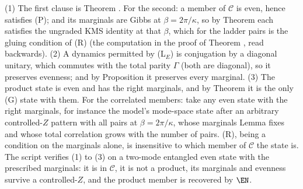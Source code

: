 (1) The first clause is Theorem . For the second: a member of $\mathcal{C}$ is even, hence satisfies (P); and its marginals are Gibbs at $\beta = 2\pi/\kappa$, so by Theorem  each satisfies the ungraded KMS identity at that $\beta$, which for the ladder pairs is the gluing condition of (R) (the computation in the proof of Theorem , read backwards). (2) A dynamics permitted by (L$_E$) is conjugation by a diagonal unitary, which commutes with the total parity $\Gamma$ (both are diagonal), so it preserves evenness; and by Proposition  it preserves every marginal. (3) The product state is even and has the right marginals, and by Theorem  it is the only (G) state with them. For the correlated members: take any even state with the right marginals, for instance the model's mode-space state after an arbitrary controlled-$Z$ pattern with all pairs at $\beta = 2\pi/\kappa$, whose marginals Lemma  fixes and whose total correlation grows with the number of pairs. (R), being a condition on the marginals alone, is insensitive to which member of $\mathcal{C}$ the state is. The script verifies (1) to (3) on a two-mode entangled even state with the prescribed marginals: it is in $\mathcal{C}$, it is not a product, its marginals and evenness survive a controlled-$Z$, and the product member is recovered by $\EN$.

